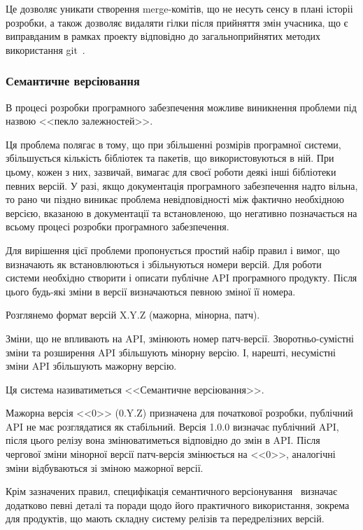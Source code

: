 Це дозволяє уникати створення merge-комітів, що не несуть сенсу в плані історіі розробки, а також дозволяє видаляти гілки після прийняття змін учасника, що є виправданим в рамках проекту відповідно до загальноприйнятих методих використання git~\cite{loeliger2012version}.

\subsubsection{Семантичне версіювання} \label{subs:semver}

В процесі розробки програмного забезпечення можливе виникнення проблеми під назвою <<пекло залежностей>>. 

Ця проблема полягає в тому, що при збільшенні розмірів програмної системи, збільшується кількість бібліотек та пакетів, що використовуються в ній. При цьому, кожен з них, зазвичай, вимагає для своєї роботи деякі інші бібліотеки певних версій. У разі, якщо документація програмного забезпечення надто вільна, то рано чи піздно виникає проблема невідповідності між фактично необхідною версією, вказаною в документації та встановленою, що негативно позначається на всьому процесі розробки програмного забезпечення.

Для вирішення цієї проблеми пропонується простий набір правил і вимог, що визначають як встановлюються і збільнуються номери версій. Для роботи системи необхідно створити і описати публічне API програмного продукту. Після цього будь-які зміни в версії визначаються певною зміної її номера.

Розглянемо формат версій X.Y.Z (мажорна, мінорна, патч).

Зміни, що не впливають на API, змінюють номер патч-версії. Зворотньо-сумістні зміни та розширення API збільшують мінорну версію. І, нарешті, несумістні зміни API збільшують мажорну версію.

Ця система називатиметься <<Семантичне версіювання>>.

Мажорна версія <<0>> (0.Y.Z) призначена для початкової розробки, публічний API не має розглядатися як стабільний. Версія 1.0.0 визначає публічний API, після цього релізу вона змінюватиметься відповідно до змін в API. Після чергової зміни мінорної версії патч-версія змінюється на <<0>>, аналогічні зміни відбуваються зі зміною мажорної версії.

Крім зазначених правил, специфікація семантичного версіонування~\cite{semver} визначає додатково певні деталі та поради щодо його практичного використання, зокрема для продуктів, що мають складну систему релізів та передрелізних версій.

